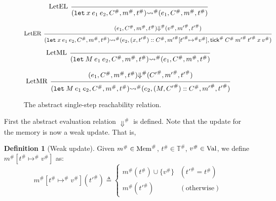 \documentclass[acmsmall,screen,review]{acmart}
\theoremstyle{definition}
\newtheorem{definition}{Definition}[section]
\newcommand*{\cons}{::}
\newcommand*{\A}[1]{{#1}^{\#}}
\newcommand*{\Time}{\mathbb{T}}
\newcommand*{\ATime}{\A{\Time}}
\newcommand*{\Value}[1]{\text{Val}\vphantom{#1}}
\newcommand*{\mem}{m}
\newcommand*{\AMem}[1]{\A{\text{Mem}}\vphantom{#1}}
\newcommand*{\tick}{\mathsf{tick}}
\begin{document}
\begin{figure}[htb]
  \[
    \begin{prooftree}
      \infer[left label=LetEL]0{
      (\mathtt{let}\:x\:e_1\:e_2, \A{C}, \A{\mem}, \A{t})
      \A\rightsquigarrow
      (e_{1}, \A{C}, \A{\mem}, \A{t})
      }
    \end{prooftree}
  \]

  \[
    \begin{prooftree}
      \hypo{
        \begin{matrix}
          (e_{1}, \A{C}, \A{\mem}, \A{t})
          \A\Downarrow
          (\A{v}, \A{\mem'}, \A{t'})
        \end{matrix}
      }
      \infer[left label=LetER]1{
      (\mathtt{let}\:x\:e_1\:e_2, \A{C}, \A{\mem}, \A{t})
      \A\rightsquigarrow
      (e_{2}, (x, \A{t'})\cons\A{C}, \A{\mem'}[\A{t'}\A{\mapsto} \A{v}], \A{\tick}\:\A{C}\:\A{\mem'}\:\A{t'}\:x\:\A{v})
      }
    \end{prooftree}
  \]

  \[
    \begin{prooftree}
      \infer[left label=LetML]0{
      (\mathtt{let}\:M\:e_{1}\:e_{2}, \A{C}, \A{\mem}, \A{t})
      \A\rightsquigarrow
      (e_{1}, \A{C}, \A{\mem}, \A{t})
      }
    \end{prooftree}
  \]

  \[
    \begin{prooftree}
      \hypo{
        \begin{matrix}
          (e_{1}, \A{C}, \A{\mem}, \A{t})
          \A\Downarrow
          (\A{C'}, \A{\mem'}, \A{t'})
        \end{matrix}
      }
      \infer[left label=LetMR]1{
      (\mathtt{let}\:M\:e_{1}\:e_{2}, \A{C}, \A{\mem}, \A{t})
      \A\rightsquigarrow
      (e_{2}, (M,\A{C'})\cons\A{C}, \A{\mem'}, \A{t'})
      }
    \end{prooftree}
  \]
  \caption{The abstract single-step reachability relation.}
  \label{fig:absreach}
\end{figure}

First the abstract evaluation relation $\A{\Downarrow}$ is defined.
Note that the update for the memory is now a weak update. That is,
\begin{definition}[Weak update]
  Given $\A{\mem}\in\AMem{\ATime}$, $\A{t}\in\ATime$, $\A{v}\in\Value{\ATime}$, we define $\A{\mem}[\A{t}\A{\mapsto}\A{v}]$ as:
  \[
    \A{\mem}[\A{t}\A{\mapsto}\A{v}](\A{t'})\triangleq
    \begin{cases}
      \A{\mem}(\A{t})\cup\{\A{v}\} & (\A{t'}=\A{t})     \\
      \A{\mem}(\A{t'})             & (\text{otherwise})
    \end{cases}
  \]
\end{definition}
\end{document}
